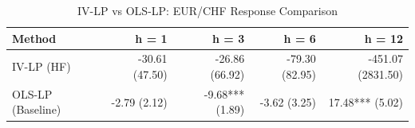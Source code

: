 \begin{table}[ht]
\centering
\caption{IV-LP vs OLS-LP: EUR/CHF Response Comparison} 
\label{tab:irf_hf_comparison}
\begin{tabular}{lrrrr}
  \toprule
Method & h = 1 & h = 3 & h = 6 & h = 12 \\ 
  \midrule
IV-LP (HF) & -30.61 (47.50) & -26.86 (66.92) & -79.30 (82.95) & -451.07 (2831.50) \\ 
  OLS-LP (Baseline) & -2.79 (2.12) & -9.68*** (1.89) & -3.62 (3.25) & 17.48*** (5.02) \\ 
   \bottomrule
\end{tabular}
\end{table}
